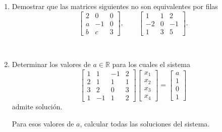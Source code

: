 \documentclass[11pt,spanish,makeidx]{amsbook}
\newcommand\R{\mathbb{R}}
\begin{document}
\begin{enumerate}
\

\item Demostrar que las matrices  siguientes no son equivalentes por filas
 $$\begin{bmatrix}2 & 0 & 0 \\a & -1 & 0 \\ b&c&3\end{bmatrix}, \qquad  \begin{bmatrix}1 & 1 & 2 \\-2 & 0 & -1 \\1&3&5\end{bmatrix}.$$

\

\item Determinar los valores de $a\in\R$ para los cuales el sistema
\[
\begin{bmatrix}1 & 1 & -1& 2 \\2 & 1 & 1 & 1 \\3&2&0&3\\1&-1&1&2\end{bmatrix}\left[\begin{array}{c}
     x_1\\x_2\\x_3\\x_4 \end{array}\right]=\left[\begin{array}{c}
     a\\1\\0\\1 \end{array}\right]
\]
admite soluci\'on. 

Para esos valores de $a$, calcular todas las soluciones del sistema.

\



\end{enumerate}
\end{document}

